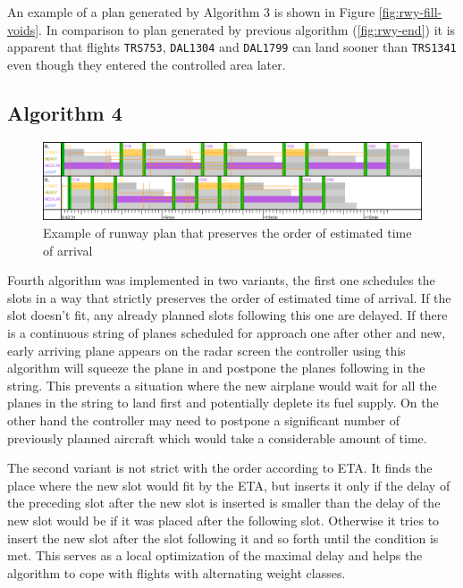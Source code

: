 An example of a plan generated by Algorithm 3 is shown in Figure \ref{fig:rwy-fill-voids}. In comparison to plan generated by previous algorithm (\ref{fig:rwy-end}) it is apparent that flights \texttt{TRS753}, \texttt{DAL1304} and \texttt{DAL1799} can land sooner than \texttt{TRS1341} even though they entered the controlled area later.

\subsection{Algorithm 4}

\begin{figure}[h]
    \centering
    \includegraphics[width=\textwidth]{figures/rwy-eta-order.png}
    \caption{Example of runway plan that preserves the order of estimated time of arrival}
    \label{fig:rwy-eta-order}
\end{figure}

Fourth algorithm was implemented in two variants, the first one schedules the slots in a way that strictly preserves the order of estimated time of arrival. If the slot doesn't fit, any already planned slots following this one are delayed. If there is a continuous string of planes scheduled for approach one after other and new, early arriving plane appears on the radar screen the controller using this algorithm will squeeze the plane in and postpone the planes following in the string. This prevents a situation where the new airplane would wait for all the planes in the string to land first and potentially deplete its fuel supply. On the other hand the controller may need to postpone a significant number of previously planned aircraft which would take a considerable amount of time.

The second variant is not strict with the order according to ETA. It finds the place where the new slot would fit by the ETA, but inserts it only if the delay of the  preceding slot after the new slot is inserted is smaller than the delay of the new slot would be if it was placed after the following slot. Otherwise it tries to insert the new slot after the slot following it and so forth until the condition is met. This serves as a local optimization of the maximal delay and helps the algorithm to cope with flights with alternating weight classes.

